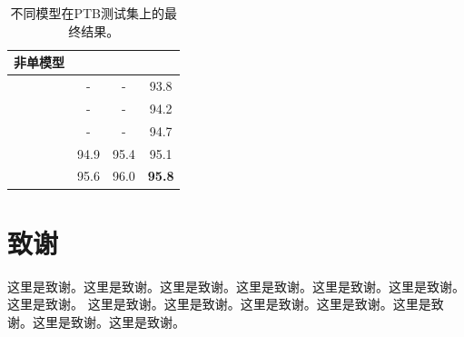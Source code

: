 \documentclass[11pt,a4paper]{article}
\begin{document}
\begin{table}[htbp]
\begin{center}
\begin{tabular}{l|ccc}
            \hline\hline
            \textbf{非单模型}                                         \\
            \hline
            \citet{DBLP:conf/emnlp/ChoeC16}           & -    & -    & 93.8          \\
            \citet{DBLP:journals/tacl/LiuZ17a}        & -    & -    & 94.2          \\
            \citet{DBLP:conf/acl/FriedSK17}           & -    & -    & 94.7          \\
            \citet{DBLP:conf/acl/KleinK18}            & 94.9 & 95.4 & 95.1          \\
            \citet{DBLP:journals/corr/abs-1812-11760} & 95.6 & 96.0 & \textbf{95.8} \\
            \hline
        \end{tabular}
    \end{center}
    \caption{不同模型在PTB测试集上的最终结果。}
    \label{Tab:FinalResults}
\end{table}


\section*{致谢}
这里是致谢。这里是致谢。这里是致谢。这里是致谢。这里是致谢。这里是致谢。这里是致谢。
这里是致谢。这里是致谢。这里是致谢。这里是致谢。这里是致谢。这里是致谢。这里是致谢。

\newpage


\end{document}
